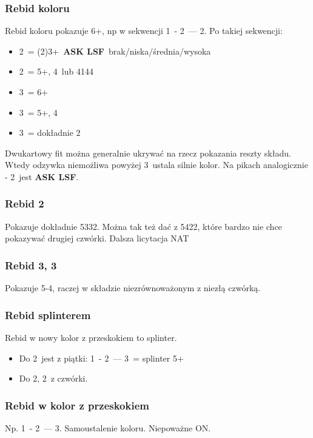 \documentclass[12pt, a4paper]{article}
\newcommand{\lsf}{\color{WildStrawberry}\textbf{ASK LSF}\color{black}}
\begin{document}
\subsubsection*{Rebid koloru}
    Rebid koloru pokazuje 6+, np w sekwencji 1\hearts\ - 2\clubs\ --- 2\hearts.
    Po takiej sekwencji:
    \begin{itemize}
        \item 2\spades\ = (2)3+\hearts\ \lsf\ brak/niska/średnia/wysoka
        \item 2\nt\ = 5+\clubs, 4\spades\ lub 4144
        \item 3\clubs\ = 6+\clubs
        \item 3\diams\ = 5+\clubs, 4\diams
        \item 3\hearts\ = dokładnie 2\hearts\
    \end{itemize}
    Dwukartowy fit można generalnie ukrywać na rzecz pokazania reszty składu. Wtedy odzywka niemożliwa powyżej
    3\nt\ ustala silnie kolor.
    Na pikach analogicznie - 2\nt\ jest \lsf.

\subsubsection*{Rebid 2\ntx}
    Pokazuje dokładnie 5332. Można tak też dać z 5422, które bardzo nie chce pokazywać drugiej czwórki.
    Dalsza licytacja NAT

\subsubsection*{Rebid 3\clubs, 3\diams}
    Pokazuje 5-4, raczej w składzie niezrównoważonym z niezłą czwórką.

\subsubsection*{Rebid splinterem}
    Rebid w nowy kolor z przeskokiem to splinter.
    \begin{itemize}
        \item Do 2\clubs\ jest z piątki: 1\spades\ - 2\clubs\ --- 3\diams\ = splinter 5+\clubs
        \item Do 2\diams, 2\hearts\ z czwórki.
    \end{itemize}

\subsubsection*{Rebid w kolor z przeskokiem}
    Np. 1\spades\ - 2\diams\ --- 3\spades. Samoustalenie koloru. Niepoważne ON.
\end{document}
